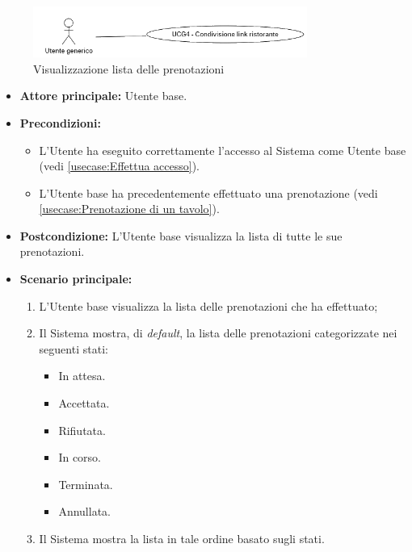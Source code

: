 \label{usecase:Visualizzazione lista delle prenotazioni}

\begin{figure}[h]
	\centering
	\includegraphics[width=0.8\textwidth]{./uml/UCG4.png} 
	\caption{Visualizzazione lista delle prenotazioni}
	\label{fig:UCG4}
  \end{figure}

\begin{itemize}
	\item \textbf{Attore principale:} Utente base.

	\item \textbf{Precondizioni:}
	      \begin{itemize}
		      \item L'Utente ha eseguito correttamente l'accesso al Sistema come Utente base (vedi \autoref{usecase:Effettua accesso}).
		      \item L'Utente base ha precedentemente effettuato una prenotazione (vedi \autoref{usecase:Prenotazione di un tavolo}).
	      \end{itemize}


	\item \textbf{Postcondizione:}
	      L'Utente base visualizza la lista di tutte le sue prenotazioni.

	\item \textbf{Scenario principale:}
	      \begin{enumerate}
		      \item L'Utente base visualizza la lista delle prenotazioni che ha effettuato;
		      \item Il Sistema mostra, di \textit{default}, la lista delle prenotazioni categorizzate nei seguenti stati:
		            \begin{itemize}
			            \item In attesa.
			            \item Accettata.
			            \item Rifiutata.
			            \item In corso.
			            \item Terminata.
			            \item Annullata.
		            \end{itemize}
		      \item Il Sistema mostra la lista in tale ordine basato sugli stati.
	      \end{enumerate}
\end{itemize}